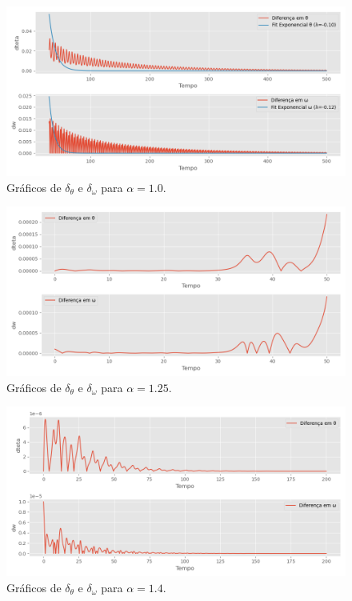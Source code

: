 \documentclass[12pt,a4paper]{article}
\begin{document}
\begin{figure}[H]
\centering
\includegraphics[width=\textwidth]{../tarefa-4d/diferencas_alpha_1.0.png}
\caption{Gráficos de $\delta_{\theta}$ e $\delta_{\omega}$ para $\alpha = 1.0$.}
\end{figure}

\begin{figure}[H]
\centering
\includegraphics[width=\textwidth]{../tarefa-4d/diferencas_alpha_1.25.png}
\caption{Gráficos de $\delta_{\theta}$ e $\delta_{\omega}$ para $\alpha = 1.25$.}
\end{figure}

\begin{figure}[H]
\centering
\includegraphics[width=\textwidth]{../tarefa-4d/diferencas_alpha_1.4.png}
\caption{Gráficos de $\delta_{\theta}$ e $\delta_{\omega}$ para $\alpha = 1.4$.}
\end{figure}
\end{document}
